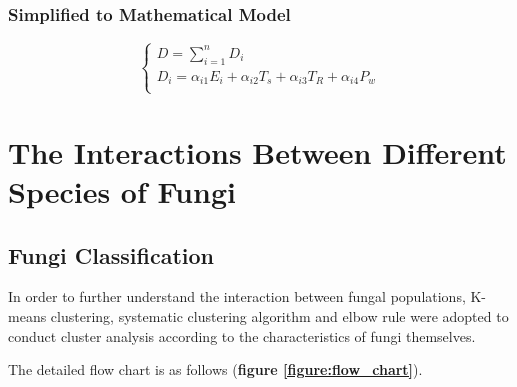 \documentclass[12pt]{article}
\begin{document}
\subsubsection{Simplified to Mathematical Model}
\begin{equation}
\begin{cases}
D=\sum\limits_{i=1}^{n}D_i\\
D_i=\alpha_{i1} E_i+\alpha_{i2} T_s+\alpha_{i3}T_R+\alpha_{i4}P_w\\
\end{cases}
\end{equation}



\section{The Interactions Between Different Species of Fungi}

%

\subsection{Fungi Classification}
In order to further understand the interaction between fungal populations, K-means clustering, systematic clustering algorithm and elbow rule were adopted to conduct cluster analysis according to the characteristics of fungi themselves.\par
The detailed flow chart is as follows (\textbf{figure \ref{figure:flow_chart}}).\par
\end{document}
